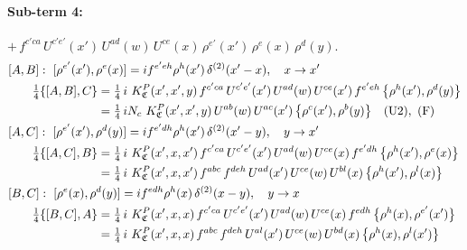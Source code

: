 \documentclass[10pt]{article}
\numberwithin{equation}{section}
\begin{document}
\paragraph{Sub-term 4:} $+\,f^{c'ca}\,U^{c'e'}(x')\,U^{ad}(w)\,U^{ce}(x)\,\rho^{e'}(x')\,\rho^{e}(x)\,\rho^{d}(y)$.
\begin{align}
&[A,B]:\ [\rho^{e'}(x'),\rho^{e}(x)]=i f^{e'eh}\rho^{h}(x')\,\delta^{(2)}(x'-x),\quad x\to x'\notag\\
&\qquad \tfrac14\{[A,B],C\}=\tfrac14\,i\,\,K^{P}_{\mathfrak C}(x',x',y)\,f^{c'ca}\,U^{c'e'}(x')\,U^{ad}(w)\,U^{ce}(x')\,f^{e'eh}\,\big\{\rho^{h}(x'),\rho^{d}(y)\big\}\notag\\
&\qquad\phantom{\tfrac14\{[A,B],C\}}=\tfrac14\,i N_{c}\,\,K^{P}_{\mathfrak C}(x',x',y)\,U^{ab}(w)\,U^{ac}(x')\,\big\{\rho^{c}(x'),\rho^{b}(y)\big\}\quad\text{(U2)},\ \text{(F)}
\label{eq:GIII.V.P-4-AB}\\
&[A,C]:\ [\rho^{e'}(x'),\rho^{d}(y)]=i f^{e'dh}\rho^{h}(x')\,\delta^{(2)}(x'-y),\quad y\to x'\notag\\
&\qquad \tfrac14\{[A,C],B\}=\tfrac14\,i\,\,K^{P}_{\mathfrak C}(x',x,x')\,f^{c'ca}\,U^{c'e'}(x')\,U^{ad}(w)\,U^{ce}(x)\,f^{e'dh}\,\big\{\rho^{h}(x'),\rho^{e}(x)\big\}\notag\\
&\qquad\phantom{\tfrac14\{[A,C],B\}}=\tfrac14\,i\,\,K^{P}_{\mathfrak C}(x',x,x')\,f^{abc}\,f^{deh}\,U^{ad}(x')\,U^{ce}(w)\,U^{bl}(x)\,\big\{\rho^{h}(x'),\rho^{l}(x)\big\}
\label{eq:GIII.V.P-4-AC}\\
&[B,C]:\ [\rho^{e}(x),\rho^{d}(y)]=i f^{edh}\rho^{h}(x)\,\delta^{(2)}(x-y),\quad y\to x\notag\\
&\qquad \tfrac14\{[B,C],A\}=\tfrac14\,i\,\,K^{P}_{\mathfrak C}(x',x,x)\,f^{c'ca}\,U^{c'e'}(x')\,U^{ad}(w)\,U^{ce}(x)\,f^{edh}\,\big\{\rho^{h}(x),\rho^{e'}(x')\big\}\notag\\
&\qquad\phantom{\tfrac14\{[B,C],A\}}=\tfrac14\,i\,\,K^{P}_{\mathfrak C}(x',x,x)\,f^{abc}\,f^{deh}\,U^{al}(x')\,U^{ce}(w)\,U^{bd}(x)\,\big\{\rho^{h}(x),\rho^{l}(x')\big\}
\label{eq:GIII.V.P-4-BC}
\end{align}
\end{document}
